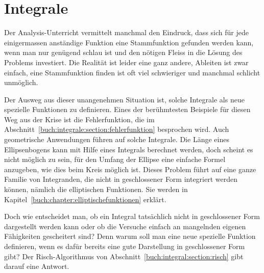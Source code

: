 %
%
%
\chapter{Integrale
\label{buch:chapter:integral}}
\rhead{}
Der Analysis-Unterricht vermittelt manchmal den Eindruck, dass sich
für jede einigermassen anständige Funktion eine Stammfunktion
gefunden werden kann, wenn man nur genügend schlau ist und den 
nötigen Fleiss in die Lösung des Problems investiert.
Die Realität ist leider eine ganz andere, Ableiten ist zwar einfach,
eine Stammfunktion finden ist oft viel schwieriger und manchmal schlicht
unmöglich.

Der Ausweg aus dieser unangenehmen Situation ist, solche Integrale
als neue spezielle Funktionen zu definieren.
Eines der berühmtesten Beispiele für diesen Weg aus der Krise ist die
Fehlerfunktion, die im Abschnitt~\ref{buch:integrale:section:fehlerfunktion}
besprochen wird.
Auch geometrische Anwendungen führen auf solche Integrale.
Die Länge eines Ellipsenbogens kann mit Hilfe eines Integrals
berechnet werden, doch scheint es nicht möglich zu sein, für den
Umfang der Ellipse eine einfache Formel anzugeben, wie dies beim
Kreis möglich ist.
Dieses Problem führt auf eine ganze Familie von Integranden, die nicht in
geschlossener Form integriert werden können, nämlich die elliptischen
Funktionen.
Sie werden in Kapitel~\ref{buch:chapter:elliptischefunktionen} erklärt.

Doch wie entscheidet man, ob ein Integral tatsächlich nicht in geschlossener
Form dargestellt werden kann oder ob die Versuche einfach an mangelnden
eigenen Fähigkeiten gescheitert sind?
Denn warum soll man eine neue spezielle Funktion definieren, wenn es
dafür bereits eine gute Darstellung in geschlossener Form gibt?
Der Risch-Algorithmus von Abschnitt~\ref{buch:integral:section:risch}
gibt darauf eine Antwort.







